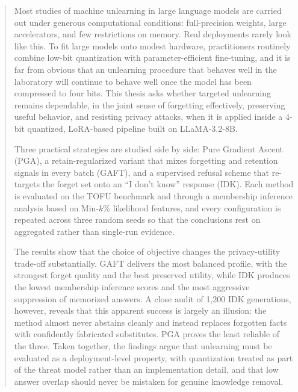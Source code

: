 \documentclass[a4paper,12pt]{report}
\begin{document}
\clearpage
\thispagestyle{empty}
\begin{abstract}
Most studies of machine unlearning in large language models are carried out under generous computational conditions: full-precision weights, large accelerators, and few restrictions on memory. Real deployments rarely look like this. To fit large models onto modest hardware, practitioners routinely combine low-bit quantization with parameter-efficient fine-tuning, and it is far from obvious that an unlearning procedure that behaves well in the laboratory will continue to behave well once the model has been compressed to four bits. This thesis asks whether targeted unlearning remains dependable, in the joint sense of forgetting effectively, preserving useful behavior, and resisting privacy attacks, when it is applied inside a 4-bit quantized, LoRA-based pipeline built on LLaMA-3.2-8B.

Three practical strategies are studied side by side: Pure Gradient Ascent (PGA), a retain-regularized variant that mixes forgetting and retention signals in every batch (GAFT), and a supervised refusal scheme that re-targets the forget set onto an ``I don't know'' response (IDK). Each method is evaluated on the TOFU benchmark and through a membership inference analysis based on Min-$k$\% likelihood features, and every configuration is repeated across three random seeds so that the conclusions rest on aggregated rather than single-run evidence.

The results show that the choice of objective changes the privacy-utility trade-off substantially. GAFT delivers the most balanced profile, with the strongest forget quality and the best preserved utility, while IDK produces the lowest membership inference scores and the most aggressive suppression of memorized answers. A close audit of 1{,}200 IDK generations, however, reveals that this apparent success is largely an illusion: the method almost never abstains cleanly and instead replaces forgotten facts with confidently fabricated substitutes. PGA proves the least reliable of the three. Taken together, the findings argue that unlearning must be evaluated as a deployment-level property, with quantization treated as part of the threat model rather than an implementation detail, and that low answer overlap should never be mistaken for genuine knowledge removal.
\end{abstract}

\clearpage
\thispagestyle{empty}
{\pagestyle{plain}
\tableofcontents
\cleardoublepage}
{\pagestyle{plain}
\listoffigures
\listoftables
\listofalgorithms
\cleardoublepage}
\end{document}
